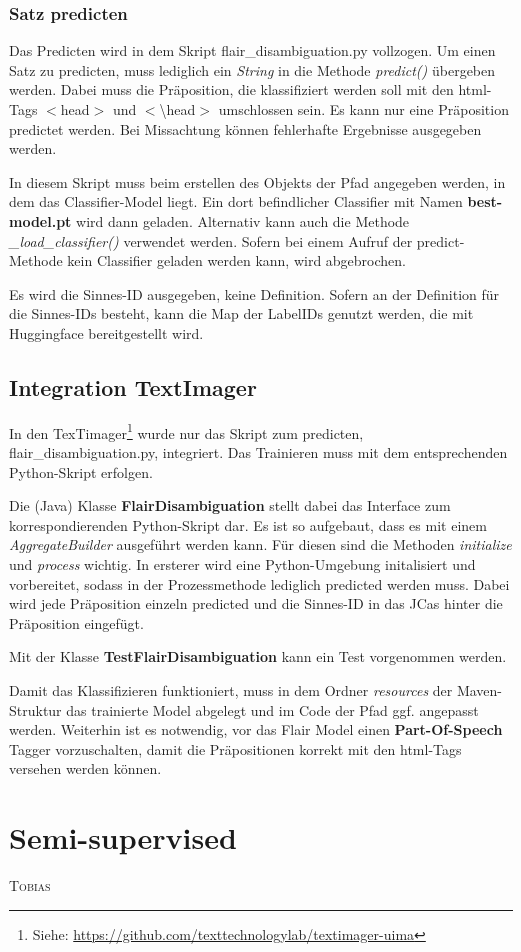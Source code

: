 \documentclass[10pt,a4paper]{article}
\newcommand{\chapterauthor}[1]{%
	{\parindent0pt\vspace*{-5pt}\hspace*{\fill}%
  \linespread{1.1}\large\scshape#1%
  \par\nobreak\vspace*{10pt}}
}
\begin{document}
\subsubsection{Satz predicten}
\begin{flushleft}
Das Predicten wird in dem Skript flair\_disambiguation.py vollzogen. Um einen Satz zu predicten, muss lediglich ein \textit{String} in die Methode \textit{predict()} übergeben werden. Dabei muss die Präposition, die klassifiziert werden soll mit den html-Tags $<$head$>$ und $<$\textbackslash head$>$ umschlossen sein. Es kann nur eine Präposition predictet werden. Bei Missachtung können fehlerhafte Ergebnisse ausgegeben werden.

In diesem Skript muss beim erstellen des Objekts der Pfad angegeben werden, in dem das Classifier-Model liegt. Ein dort befindlicher Classifier mit Namen \textbf{best-model.pt} wird dann geladen. Alternativ kann auch die Methode \textit{\_load\_classifier()} verwendet werden. Sofern bei einem Aufruf der predict-Methode kein Classifier geladen werden kann, wird abgebrochen.

Es wird die Sinnes-ID ausgegeben, keine Definition. Sofern an der Definition für die Sinnes-IDs besteht, kann die Map der LabelIDs genutzt werden, die mit Huggingface bereitgestellt wird.
\end{flushleft}

\subsection{Integration TextImager}
\begin{flushleft}
In den TexTimager\footnote{Siehe: \url{https://github.com/texttechnologylab/textimager-uima}} wurde nur das Skript zum predicten, flair\_disambiguation.py, integriert. Das Trainieren muss mit dem entsprechenden Python-Skript erfolgen.

Die (Java) Klasse \textbf{FlairDisambiguation} stellt dabei das Interface zum korrespondierenden Python-Skript dar. Es ist so aufgebaut, dass es mit einem \textit{AggregateBuilder} ausgeführt werden kann. Für diesen sind die Methoden \textit{initialize} und \textit{process} wichtig. In ersterer wird eine Python-Umgebung initalisiert und vorbereitet, sodass in der Prozessmethode lediglich predicted werden muss. Dabei wird jede Präposition einzeln predicted und die Sinnes-ID in das JCas hinter die Präposition eingefügt.

Mit der Klasse \textbf{TestFlairDisambiguation} kann ein Test vorgenommen werden.

Damit das Klassifizieren funktioniert, muss in dem Ordner \textit{resources} der Maven-Struktur das trainierte Model abgelegt und im Code der Pfad ggf. angepasst werden. Weiterhin ist es notwendig, vor das Flair Model einen \textbf{Part-Of-Speech} Tagger vorzuschalten, damit die Präpositionen korrekt mit den html-Tags versehen werden können.
\end{flushleft}

\newpage

\section{Semi-supervised}
\chapterauthor{Tobias}

\newpage

\begingroup
\raggedright
\sloppy
\printbibliography
\endgroup
\end{document}
